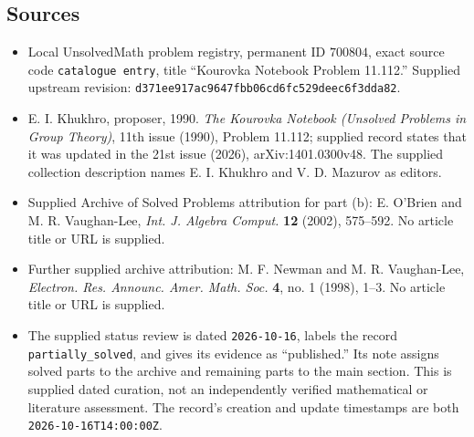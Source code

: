 \documentclass[11pt]{article}
\begin{document}
\subsection{Sources}
\begin{itemize}
\item Local UnsolvedMath problem registry, permanent ID \(700804\), exact source code \texttt{catalogue entry}, title ``Kourovka Notebook Problem 11.112.'' Supplied upstream revision: \texttt{d371ee917ac9647fbb06cd6fc529deec6f3dda82}.
\item E. I. Khukhro, proposer, 1990. \emph{The Kourovka Notebook (Unsolved Problems in Group Theory)}, 11th issue (1990), Problem 11.112; supplied record states that it was updated in the 21st issue (2026), arXiv:1401.0300v48. The supplied collection description names E. I. Khukhro and V. D. Mazurov as editors.
\item Supplied Archive of Solved Problems attribution for part (b): E. O'Brien and M. R. Vaughan-Lee, \emph{Int. J. Algebra Comput.} \textbf{12} (2002), 575--592. No article title or URL is supplied.
\item Further supplied archive attribution: M. F. Newman and M. R. Vaughan-Lee, \emph{Electron. Res. Announc. Amer. Math. Soc.} \textbf{4}, no. 1 (1998), 1--3. No article title or URL is supplied.
\item The supplied status review is dated \texttt{2026-10-16}, labels the record \texttt{partially\_solved}, and gives its evidence as ``published.'' Its note assigns solved parts to the archive and remaining parts to the main section. This is supplied dated curation, not an independently verified mathematical or literature assessment. The record's creation and update timestamps are both \texttt{2026-10-16T14:00:00Z}.
\end{itemize}
\end{document}
